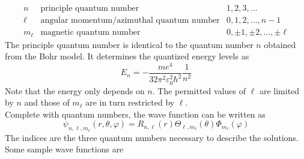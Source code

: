 \documentclass{subfiles}
\begin{document}
				\[
					\begin{array}{lll}
						n & \text{principle quantum number} & 1, 2, 3, \ldots \\
						\ell & \text{angular momentum/azimuthal quantum number} & 0, 1, 2, \ldots, n - 1 \\
						m_\ell & \text{magnetic quantum number} & 0, \pm 1, \pm 2, \ldots, \pm \ell
					\end{array}
						\tag{quantum numbers}
				\]
				The principle quantum number is identical to the quantum number \(n\) obtained from the Bohr model. It determines the quantized energy levels as
				\[E_n = -\frac{me^4}{32\pi^2\varepsilon_0^2\hbar^2}\frac{1}{n^2}\]
				Note that the energy only depends on \(n\). The permitted values of \(\ell\) are limited by \(n\) and those of \(m_\ell\) are in turn restricted by \(\ell\). \\
				Complete with quantum numbers, the wave function can be written as
				\[\psi_{n, \ell, m_\ell}(r, \theta, \varphi) = R_{n, \ell}(r)\Theta_{\ell, m_\ell}(\theta)\Phi_{m_\ell}(\varphi)\]
			The indices are the three quantum numbers necessary to describe the solutions. Some sample wave functions are
\end{document}
